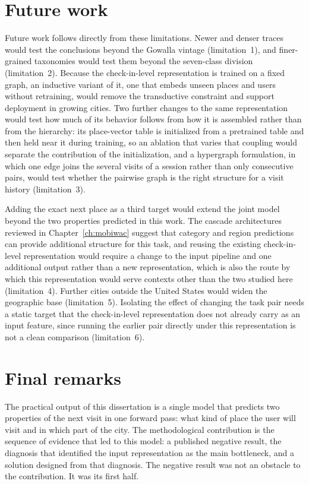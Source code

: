 \section{Future work}
\label{sec:conc:future}

Future work follows directly from these limitations. Newer and denser traces would
test the conclusions beyond the Gowalla vintage (limitation~1), and finer-grained
taxonomies would test them beyond the seven-class division (limitation~2). Because the
check-in-level representation is trained on a fixed graph, an inductive variant of it,
one that embeds unseen places and users without retraining, would remove the
transductive constraint and support deployment in growing cities. Two further changes to
the same representation would test how much of its behavior follows from how it is
assembled rather than from the hierarchy: its place-vector table is initialized from a
pretrained table and then held near it during training, so an ablation that varies that
coupling would separate the contribution of the initialization, and a hypergraph
formulation, in which one edge joins the several visits of a session rather than only
consecutive pairs, would test whether the pairwise graph is the right structure for a
visit history (limitation~3).

Adding the exact next place as a third target would extend the joint model beyond the
two properties predicted in this work. The cascade architectures reviewed in
Chapter~\ref{ch:mobiwac} suggest that category and region predictions can provide
additional structure for this task, and reusing the existing check-in-level
representation would require a change to the input pipeline and one additional output
rather than a new representation, which is also the route by which this representation
would serve contexts other than the two studied here (limitation~4).
Further cities outside the United States would widen the geographic base
(limitation~5).
Isolating the effect of changing the task pair needs a static target
that the check-in-level representation does not already carry as an input feature, since
running the earlier pair directly under this representation is not a clean comparison
(limitation~6).



\section{Final remarks}
\label{sec:conc:final}

The practical output of this dissertation is a single model that predicts two
properties of the next visit in one forward pass: what kind of place the user will
visit and in which part of the city. The methodological contribution is the sequence
of evidence that led to this model: a published negative result, the diagnosis that
identified the input representation as the main bottleneck, and a solution designed
from that diagnosis. The negative result was not an obstacle to the contribution. It
was its first half.
